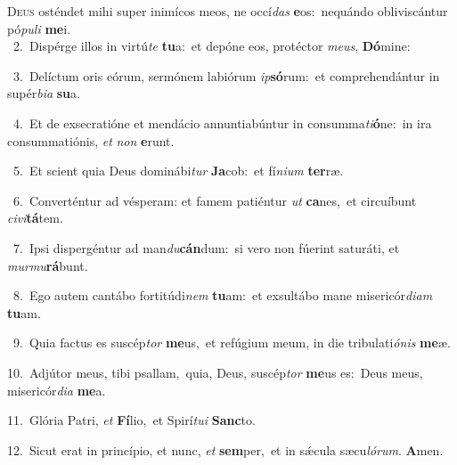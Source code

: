 \lettrine{\initial\textcolor{\initialcolor}{D}}{eus} osténdet mihi super inimícos meos, ne occí\textit{das} \textbf{e}\-os:~\star nequándo obliviscántur pó\-\textit{pu}\-\textit{li} \textbf{me}\-i.\\
{\numbfont\textcolor{\numbcolor}{~2.}}~Dispérge illos in virtú\textit{te} \textbf{tu}\-a:~\star et depóne eos, protéctor \textit{me}\-\textit{us}, \textbf{Dó}\-mine:\par
{\numbfont\textcolor{\numbcolor}{~3.}}~Delíctum oris eórum, sermónem labiórum \textit{ip}\-\textbf{só}rum:~\star et comprehendántur in supér\-\textit{bi}\-\textit{a} \textbf{su}\-a.\par
{\numbfont\textcolor{\numbcolor}{~4.}}~Et de exsecratióne et mendácio annuntiabúntur in consumma\-\textit{ti}\-\textbf{ó}ne:~\star in ira consummatiónis, \textit{et} \textit{non} \textbf{e}\-runt.\par
{\numbfont\textcolor{\numbcolor}{~5.}}~Et scient quia Deus dominábi\textit{tur} \textbf{Ja}\-cob:~\star et fí\-\textit{ni}\-\textit{um} \textbf{ter}\-ræ.\par
{\numbfont\textcolor{\numbcolor}{~6.}}~Converténtur ad vésperam: et famem patiéntur \textit{ut} \textbf{ca}\-nes,~\star et circuíbunt \textit{ci}\-\textit{vi}\textbf{tá}tem.\par
{\numbfont\textcolor{\numbcolor}{~7.}}~Ipsi dispergéntur ad man\-\textit{du}\-\textbf{cán}dum:~\star si vero non fúerint saturáti, et \textit{mur}\-\textit{mu}\textbf{rá}bunt.\par
{\numbfont\textcolor{\numbcolor}{~8.}}~Ego autem cantábo fortitúdi\textit{nem} \textbf{tu}\-am:~\star et exsultábo mane misericór\-\textit{di}\-\textit{am} \textbf{tu}\-am.\par
{\numbfont\textcolor{\numbcolor}{~9.}}~Quia factus es suscép\textit{tor} \textbf{me}\-us,~\star et refúgium meum, in die tribulati\-\textit{ó}\-\textit{nis} \textbf{me}\-æ.\par
{\numbfont\textcolor{\numbcolor}{10.}}~Adjútor meus, tibi psallam,~\dagger quia, Deus, suscép\textit{tor} \textbf{me}\-us es:~\star Deus meus, misericór\-\textit{di}\-\textit{a} \textbf{me}\-a.\par
{\numbfont\textcolor{\numbcolor}{11.}}~Glória Patri, \textit{et} \textbf{Fí}\-lio,~\star et Spirí\-\textit{tu}\-\textit{i} \textbf{Sanc}\-to.\par
{\numbfont\textcolor{\numbcolor}{12.}}~Sicut erat in princípio, et nunc, \textit{et} \textbf{sem}\-per,~\star et in sǽcula sæcu\-\textit{ló}\-\textit{rum}. \textbf{A}\-men.\par
